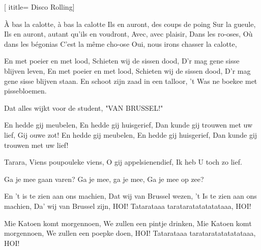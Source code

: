 [
ititle= {Disco Rolling}]


\beginverse
À bas la calotte, à bas la calotte
Ils en auront, des coups de poing
Sur la gueule,
Ils en auront, autant qu'ils en voudront,
Avec, avec plaisir,
Dans les ro-oses,
Où dans les bégonias
C'est la même cho-ose
Oui, nous irons chasser la calotte,
\endverse

\beginverse
En met poeier en met lood,
Schieten wij de sissen dood,
D'r mag gene sisse blijven leven,
En met poeier en met lood,
Schieten wij de sissen dood,
D'r mag gene sisse blijven staan.
 {En schoot zijn zaad in een talloor,} {'t Was ne boekee met pissebloemen.}
\endverse

\beginverse
{} {Dat alles wijkt voor de student,} {"VAN BRUSSEL!"}
\endverse

\beginverse
En hedde gij meubelen,
En hedde gij huisgerief,
Dan kunde gij trouwen met uw lief,
Gij ouwe zot!
En hedde gij meubelen,
En hedde gij huisgerief,
Dan kunde gij trouwen met uw lief!
\endverse

\beginverse
Tarara,
 {Viens poupouleke viens,} {O gij appelsienendief,} {Ik heb U toch zo lief.}
\endverse

\beginverse
{} {Ga je mee gaan varen?} {Ga je mee, ga je mee,} {Ga je mee op zee?}
\endverse

\beginverse
En 't is te zien aan ons machien,
Dat wij van Brussel wezen,
't Is te zien aan ons machien,
Da' wij van Brussel zijn, HOI!
Tatarataaa tarataratatatatataaa, HOI!
\endverse

\beginverse
Mie Katoen komt morgennoen,
We zullen een pintje drinken,
Mie Katoen komt morgennoen,
We zullen een poepke doen, HOI!
Tatarataaa tarataratatatatataaa, HOI!
\endverse

\endsong